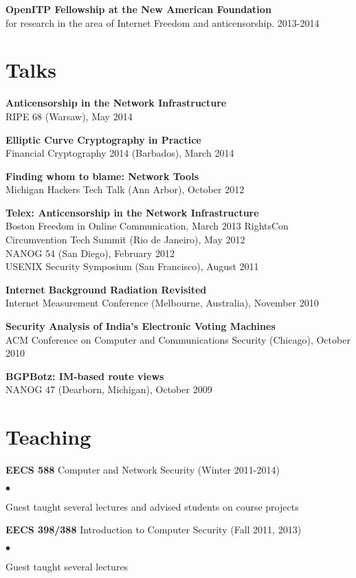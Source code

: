 \documentclass{res}
\newcommand{\sqitem}{\item[\tiny$\blacksquare$]}
\newcommand{\sqlist}{\begin{list}{$\bullet$}
  { \setlength{\itemsep}{0pt}
	\setlength{\parsep}{0pt}
	\setlength{\topsep}{0pt}
	\setlength{\partopsep}{0pt}
	\setlength{\leftmargin}{6.0em}
	\setlength{\labelsep}{2.5em} } }
\newcommand{\sqend}{\end{list}}
\begin{document}
\begin{resume}
    \textbf{OpenITP Fellowship at the New American Foundation} \\
    for research in the area of Internet Freedom and anticensorship. 2013-2014

\section{Talks}

    \textbf{Anticensorship in the Network Infrastructure} \\
    RIPE 68 (Warsaw), May 2014

    \textbf{Elliptic Curve Cryptography in Practice} \\
    Financial Cryptography 2014 (Barbados), March 2014

    \textbf{Finding whom to blame: Network Tools} \\
    Michigan Hackers Tech Talk (Ann Arbor), October 2012

    \textbf{Telex: Anticensorship in the Network Infrastructure} \\
    Boston Freedom in Online Communication, March 2013
    RightsCon Circumvention Tech Summit (Rio de Janeiro), May 2012 \\
    NANOG 54 (San Diego), February 2012 \\
    USENIX Security Symposium (San Francisco), August 2011

    \textbf{Internet Background Radiation Revisited} \\
    Internet Measurement Conference (Melbourne, Australia), November 2010

    \textbf{Security Analysis of India's Electronic Voting Machines} \\
    ACM Conference on Computer and Communications Security (Chicago), October 2010

    \textbf{BGPBotz: IM-based route views} \\
    NANOG 47 (Dearborn, Michigan), October 2009

\section{Teaching}
    \textbf{EECS 588} Computer and Network Security (Winter 2011-2014)
        \sqlist
        \sqitem Guest taught several lectures and advised students on course projects
        \sqend

    \textbf{EECS 398/388} Introduction to Computer Security (Fall 2011, 2013)
        \sqlist
        \sqitem Guest taught several lectures
        \sqend


\end{resume}
\end{document}
